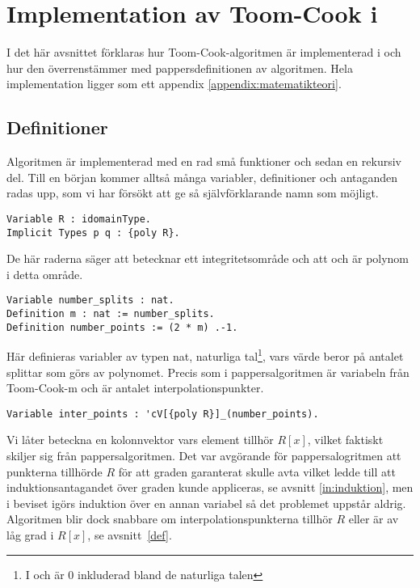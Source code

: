 \section{Implementation av Toom-Cook i \coq}
\label{sec:formellimplementation}
I det här avsnittet förklaras hur Toom-Cook-algoritmen är implementerad i \ssr
och hur den överrenstämmer med pappersdefinitionen av algoritmen. Hela
implementation ligger som ett appendix \ref{appendix:matematikteori}.

\subsection{Definitioner}
Algoritmen är implementerad med en rad små funktioner och sedan en rekursiv
del. Till en början kommer alltså många variabler, definitioner och antaganden
radas upp, som vi har försökt att ge så självförklarande namn som möjligt.

\begin{lstlisting}
Variable R : idomainType.
Implicit Types p q : {poly R}.
\end{lstlisting}

De här raderna säger att  betecknar ett integritetsområde och att 
och  är polynom i detta område.

\begin{lstlisting}
Variable number_splits : nat.
Definition m : nat := number_splits.
Definition number_points := (2 * m) .-1.
\end{lstlisting}

Här definieras variabler av typen nat, naturliga tal\footnote{I \coq och \ssr
är 0 inkluderad bland de naturliga talen}, vars värde beror på antalet splittar
som görs av polynomet. Precis som i pappersalgoritmen är  variabeln från
Toom-Cook-m och  är antalet interpolationspunkter.

\begin{lstlisting}
Variable inter_points : 'cV[{poly R}]_(number_points).
\end{lstlisting}

Vi låter  beteckna en kolonnvektor vars element tillhör $R[x]$,
vilket faktiskt skiljer sig från pappersalgoritmen. Det var avgörande för
pappersalogritmen att punkterna tillhörde $R$ för att graden garanterat skulle
avta vilket ledde till att induktionsantagandet över graden kunde appliceras,
se avsnitt \ref{in:induktion}, men i beviset i\ssr görs induktion över en annan
variabel så det problemet uppstår aldrig. Algoritmen blir dock snabbare om
interpolationspunkterna tillhör $R$ eller är av låg grad i $R[x]$, se
avsnitt~\ref{def}.

